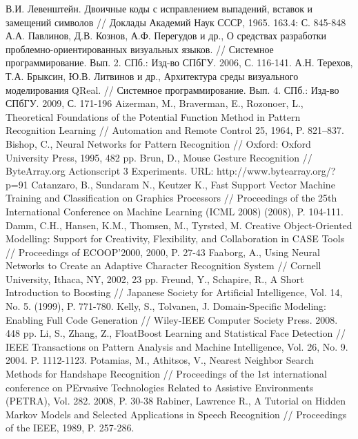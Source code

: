 \documentclass[a5paper]{article}
\begin{document}
\pagebreak

\begin{thebibliography}{9001}
   В.И. Левенштейн. Двоичные коды с исправлением выпадений, вставок и замещений символов // Доклады Академий Наук СССР, 1965. 163.4: С. 845-848
   А.А. Павлинов, Д.В. Кознов, А.Ф. Перегудов и др., О средствах разработки проблемно-ориентированных визуальных языков. // Системное программирование. Вып. 2. СПб.: Изд-во СПбГУ. 2006,  С. 116-141.
   А.Н. Терехов, Т.А. Брыксин, Ю.В. Литвинов и др., Архитектура среды визуального моделирования QReal. // Системное программирование. Вып. 4. СПб.: Изд-во СПбГУ. 2009, С. 171-196
   Aizerman, M., Braverman, E., Rozonoer, L., Theoretical Foundations of the Potential Function Method in Pattern Recognition Learning // Automation and Remote Control 25, 1964, P. 821–837.
   Bishop, C., Neural Networks for Pattern Recognition // Oxford: Oxford University Press, 1995, 482 pp.
   Brun, D., Mouse Gesture Recognition // ByteArray.org Actionscript 3 Experiments. URL: http://www.bytearray.org/?p=91 
   Catanzaro, B., Sundaram N., Keutzer K., Fast Support Vector Machine Training and Classification on Graphics Processors // Proceedings of the 25th International Conference on Machine Learning (ICML 2008) (2008), P. 104-111.
   Damm, C.H., Hansen, K.M., Thomsen, M., Tyrsted, M. Creative Object-Oriented Modelling: Support for Creativity, Flexibility, and Collaboration in CASE Tools // Proceedings of ECOOP'2000, 2000, P. 27-43
   Faaborg, A., Using Neural Networks to Create an Adaptive Character Recognition System // Cornell University, Ithaca, NY, 2002, 23 pp.
   Freund, Y., Schapire, R., A Short Introduction to Boosting // Japanese Society for Artificial Intelligence, Vol. 14, No. 5. (1999), P. 771-780.
   Kelly, S., Tolvanen, J. Domain-Specific Modeling: Enabling Full Code Generation // Wiley-IEEE Computer Society Press. 2008. 448 pp.
   Li, S., Zhang, Z., FloatBoost Learning and Statistical Face Detection // IEEE Transactions on Pattern Analysis and Machine Intelligence, Vol. 26, No. 9. 2004. P. 1112-1123.
   Potamias, M., Athitsos, V., Nearest Neighbor Search Methods for Handshape Recognition // Proceedings of the 1st international conference on PErvasive Technologies Related to Assistive Environments (PETRA), Vol. 282. 2008, P. 30-38
   Rabiner, Lawrence R., A Tutorial on Hidden Markov Models and Selected Applications in Speech Recognition // Proceedings of the IEEE, 1989, P. 257-286.

\end{thebibliography}
\end{document}
